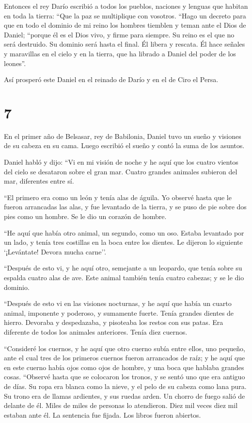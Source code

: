 Entonces el rey Darío escribió a todos los pueblos,
naciones y lenguas que habitan en toda la tierra: ``Que la paz se
multiplique con vosotros.  ``Hago un decreto para que en
todo el dominio de mi reino los hombres tiemblen y teman ante el Dios de
Daniel; ``porque él es el Dios vivo, y firme para siempre. Su reino es
el que no será destruido. Su dominio será hasta el final.
 Él libera y rescata. Él hace señales y maravillas en el
cielo y en la tierra, que ha librado a Daniel del poder de los leones''.

 Así prosperó este Daniel en el reinado de Darío y en el
de Ciro el Persa.

\hypertarget{section-6}{%
\section{7}\label{section-6}}

 En el primer año de Belsasar, rey de Babilonia, Daniel
tuvo un sueño y visiones de su cabeza en su cama. Luego escribió el
sueño y contó la suma de los asuntos.

 Daniel habló y dijo: ``Vi en mi visión de noche y he aquí
que los cuatro vientos del cielo se desataron sobre el gran mar.
 Cuatro grandes animales subieron del mar, diferentes
entre sí.

 ``El primero era como un león y tenía alas de águila. Yo
observé hasta que le fueron arrancadas las alas, y fue levantado de la
tierra, y se puso de pie sobre dos pies como un hombre. Se le dio un
corazón de hombre.

 ``He aquí que había otro animal, un segundo, como un oso.
Estaba levantado por un lado, y tenía tres costillas en la boca entre
los dientes. Le dijeron lo siguiente `¡Levántate! Devora mucha carne''.

 ``Después de esto vi, y he aquí otro, semejante a un
leopardo, que tenía sobre su espalda cuatro alas de ave. Este animal
también tenía cuatro cabezas; y se le dio dominio.

 ``Después de esto vi en las visiones nocturnas, y he aquí
que había un cuarto animal, imponente y poderoso, y sumamente fuerte.
Tenía grandes dientes de hierro. Devoraba y despedazaba, y pisoteaba los
restos con sus patas. Era diferente de todos los animales anteriores.
Tenía diez cuernos.

 ``Consideré los cuernos, y he aquí que otro cuerno subía
entre ellos, uno pequeño, ante el cual tres de los primeros cuernos
fueron arrancados de raíz; y he aquí que en este cuerno había ojos como
ojos de hombre, y una boca que hablaba grandes cosas. 
``Observé hasta que se colocaron los tronos, y se sentó uno que era
antiguo de días. Su ropa era blanca como la nieve, y el pelo de su
cabeza como lana pura. Su trono era de llamas ardientes, y sus ruedas
arden.  Un chorro de fuego salió de delante de él. Miles
de miles de personas lo atendieron. Diez mil veces diez mil estaban ante
él. La sentencia fue fijada. Los libros fueron abiertos.

